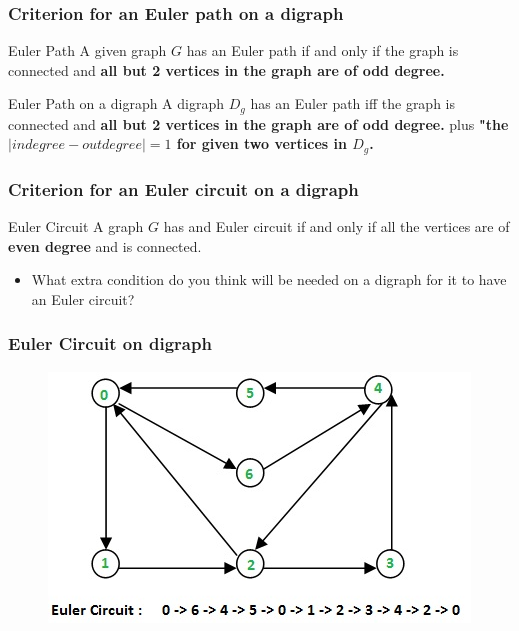 \documentclass{beamer}
\begin{document}

\begin{frame}
\frametitle{Criterion for an Euler path on a digraph}
\begin{block}{Euler Path}
A given graph $G$ has an Euler path if and only if the graph is connected and  \textbf{all but 2 vertices in the graph are of odd degree.}
\end{block}

\begin{block}{Euler Path on a digraph}
A digraph $D_g$ has an Euler path iff the graph is connected and  \textbf{all but 2 vertices in the graph are of odd degree.} plus \textbf{"the $|indegree - outdegree| = 1$ for given two vertices in $D_g$.}
\end{block}
\end{frame}


\begin{frame}
\frametitle{Criterion for an Euler circuit on a digraph}
\begin{block}{Euler Circuit}
A graph $G$ has and Euler circuit if and only if all the vertices are of \textbf{even degree} and is connected. 
\end{block}
\pause
\begin{itemize}
\item What extra condition do you think will be needed on a digraph for it to have an Euler circuit?
\end{itemize}
\end{frame}


\begin{frame}
\frametitle{Euler Circuit on digraph}
\begin{figure}[h]
\includegraphics[scale = 0.8]{eulerdi.jpg}
\end{figure}
\end{frame}
\end{document}
